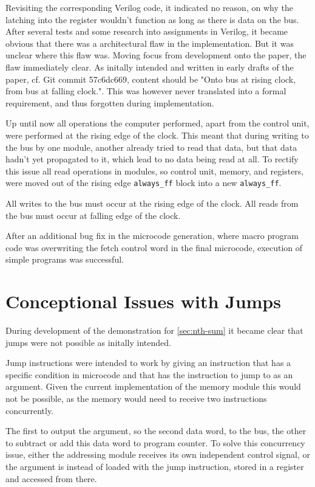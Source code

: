 Revisiting the corresponding Verilog code, it indicated no reason, on why the latching into the register wouldn't function as long as there is data on the bus. After several tests and some research into assignments in Verilog, it became obvious that there was a architectural flaw in the implementation. But it was unclear where this flaw was. Moving focus from development onto the paper, the flaw immediately clear. As initally intended and written in early drafts of the paper, cf. Git commit 57c6dc669, content should be "Onto bus at rising clock, from bus at falling clock.". This was however never translated into a formal requirement, and thus forgotten during implementation. 

Up until now all operations the computer performed, apart from the control unit, were performed at the rising edge of the clock. This meant that during writing to the bus by one module, another already tried to read that data, but that data hadn't yet propagated to it, which lead to no data being read at all. To rectify this issue all read operations in modules, so control unit, memory, and registers, were moved out of the rising edge \texttt{always\_ff} block into a new \texttt{always\_ff}. 

\begin{arch-requirement} \label{req:bus-read-write}
  All writes to the bus must occur at the rising edge of the clock. All reads from the bus must occur at falling edge of the clock.
\end{arch-requirement}

After an additional bug fix in the microcode generation, where macro program code was overwriting the fetch control word in the final microcode, execution of simple programs was successful.


\section{Conceptional Issues with Jumps}
During development of the demonstration for \ref{sec:nth-sum} it became clear that jumps were not possible as initally intended. 

Jump instructions were intended to work by giving an instruction that has a specific condition in microcode and that has the instruction to jump to as an argument. Given the current implementation of the memory module this would not be possible, as the memory would need to receive two instructions concurrently. 

The first to output the argument, so the second data word, to the bus, the other to subtract or add this data word to program counter. To solve this concurrency issue, either the addressing module receives its own independent control signal, or the argument is instead of loaded with the jump instruction, stored in a register and accessed from there. 

